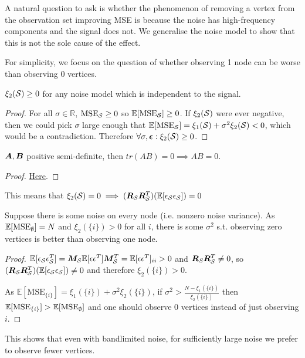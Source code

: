 {A natural question to ask is whether the phenomenon of removing a vertex from the observation set improving MSE is because the noise has high-frequency components and the signal does not. We generalise the noise model to show that this is not the sole cause of the effect.

For simplicity, we focus on the question of whether observing 1 node can be worse than observing 0 vertices.


\begin{lemma}
    $\xi_{2}(\mathcal{S}) \geq 0$ for any noise model which is independent to the signal.
\end{lemma}
\begin{proof}
    For all $\sigma \in \mathbb{R}$, $\textrm{MSE}_{\mathcal{S}} \geq 0$ so $\mathbb{E}[\textrm{MSE}_{\mathcal{S}}] \geq 0$. If $\xi_{2}(\mathcal{S})$ were ever negative, then we could pick $\sigma$ large enough that $\mathbb{E}[\textrm{MSE}_{\mathcal{S}}]  = \xi_{1}(\mathcal{S}) + \sigma^{2} \xi_{2}(\mathcal{S}) <0$, which would be a contradiction. Therefore $\forall \sigma, \bm{\epsilon}: \xi_{2}(\mathcal{S}) \geq 0$.

\end{proof}

\begin{lemma}
$\bm{A},\bm{B}$ positive semi-definite, then $tr(AB) = 0 \implies AB = 0$.
\end{lemma}
\begin{proof}
    \href{https://math.stackexchange.com/questions/3536270/if-a-b-are-positive-semi-definite-then-trab-0-iff-ab-0}{Here}.
\end{proof}
This means that $\xi_{2}(\mathcal{S}) = 0 \implies (\bm{R}_{\mathcal{S}}\bm{R}_{\mathcal{S}}^{T})(\mathbb{E}[\epsilon_{\mathcal{S}}\epsilon_{\mathcal{S}}]) = 0$
\begin{remark}
    Suppose there is some noise on every node (i.e. nonzero noise variance). As $\mathbb{E}[\textrm{MSE}_{\mathcal{\emptyset}}] = N$ and $\xi_{2}(\{i\}) > 0$ for all $i$, there is some $\sigma^{2}$ s.t. observing zero vertices is better than observing one node.
\end{remark}
\begin{proof}
    $\mathbb{E}[\epsilon_{\mathcal{S}}\epsilon_{\mathcal{S}}^{T}] = \bm{M}_{\mathcal{S}}\mathbb{E}[\epsilon\epsilon^{T}]\bm{M}_{\mathcal{S}}^{T} = \mathbb{E}[\epsilon\epsilon^{T}]_{ii} > 0 $ and $\bm{R}_{S}\bm{R}_{\mathcal{S}}^{T} \neq 0$, so $(\bm{R}_{\mathcal{S}}\bm{R}_{\mathcal{S}}^{T})(\mathbb{E}[\epsilon_{\mathcal{S}}\epsilon_{\mathcal{S}}]) \neq 0$ and therefore $\xi_{2}(\{i\}) > 0$.

    As $\mathbb{E}[\mathrm{MSE}_{\{i\}}] = \xi_{1}(\{i\}) + \sigma^{2} \xi_{2}(\{i\})$, if $\sigma^{2} > \frac{N - \xi_{1}(\{i\})}{\xi_{2}(\{i\})}$ then $\mathbb{E}[\mathrm{MSE}_{\{i\}}] > \mathbb{E}[\mathrm{MSE}_{\mathcal{\emptyset}}] $ and one should observe 0 vertices instead of just observing $i$. 
\end{proof}

This shows that even with bandlimited noise, for sufficiently large noise we prefer to observe fewer vertices.
}
\fi


